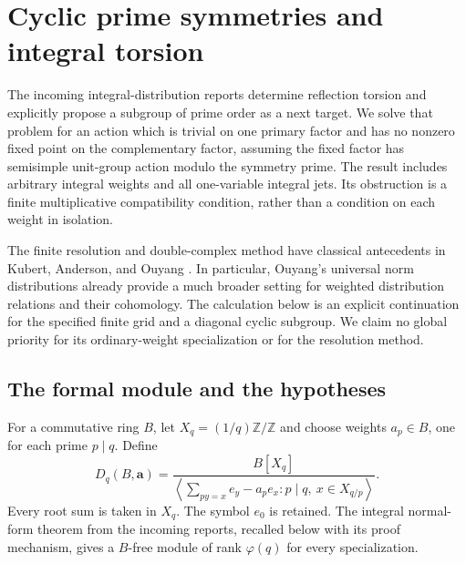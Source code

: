 \section{Cyclic prime symmetries and integral torsion}
\label{cpc:sec:main}

The incoming integral-distribution reports \cite{integraljets} determine reflection torsion
and explicitly propose a subgroup of prime order as a next target.
We solve that problem for an action which is trivial on one primary
factor and has no nonzero fixed point on the complementary factor,
assuming the fixed factor has semisimple unit-group action modulo the
symmetry prime. The result includes arbitrary integral weights and all
one-variable integral jets. Its obstruction is a finite multiplicative
compatibility condition, rather than a condition on each weight in
isolation.

The finite resolution and double-complex method have classical
antecedents in Kubert, Anderson, and Ouyang
\cite{cpc:Kubert1979,cpc:Ouyang2001,cpc:Ouyang2002}.
In particular, Ouyang's universal norm distributions already provide a
much broader setting for weighted distribution relations and their
cohomology. The calculation below is an explicit continuation for the
specified finite grid and a diagonal cyclic subgroup. We claim no global
priority for its ordinary-weight specialization or for the resolution
method.

\subsection{The formal module and the hypotheses}

For a commutative ring $B$, let $X_q=(1/q)\mathbb Z/\mathbb Z$ and
choose weights $a_p\in B$, one for each prime $p\mid q$. Define
\begin{equation}\label{cpc:eq:distribution}
 D_q(B,\mathbf a)=
 \frac{B[X_q]}{
 \left\langle\displaystyle\sum_{py=x}e_y-a_pe_x:
                    p\mid q,\ x\in X_{q/p}\right\rangle}.
\end{equation}
Every root sum is taken in $X_q$. The symbol $e_0$ is retained.
The integral normal-form theorem from the incoming reports, recalled
below with its proof mechanism, gives a $B$-free module of rank
$\varphi(q)$ for every specialization.

